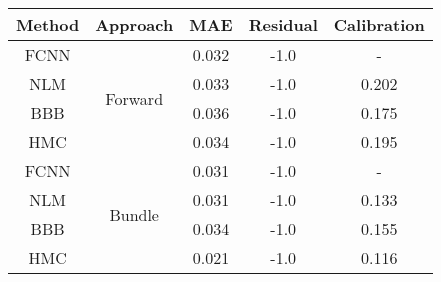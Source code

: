 \documentclass[convert={outext=.png}]{standalone}
\begin{document}
\centering
\label{tab:experimental_results}

\begin{tabular}{c c c c c}

\hline
\hline
Method & Approach &  MAE & Residual & Calibration \\ \hline
 FCNN & \multirow{4}{*}{Forward} & 0.032 & -1.0 & - \\
 NLM &  & 0.033 & -1.0 & 0.202 \\
 BBB &  & 0.036 & -1.0 & 0.175 \\
 HMC &  & 0.034 & -1.0 & 0.195 \\
 \hline
 FCNN & \multirow{4}{*}{Bundle} & 0.031 & -1.0 & - \\
 NLM &  & 0.031 & -1.0 & 0.133 \\
 BBB &  & 0.034 & -1.0 & 0.155 \\
 HMC &  & 0.021 & -1.0 & 0.116 \\
\hline
\hline
\end{tabular}
\end{document}
